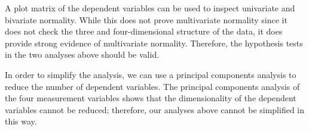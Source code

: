 \documentclass[11pt]{article} %
\begin{document}
\bigskip


A plot matrix of the dependent variables can be used to inspect univariate and bivariate normality. While this does not prove multivariate normality since it does not check the three and four-dimensional structure of the data, it does provide strong evidence of multivariate normality. Therefore, the hypothesis tests in the two analyses above should be valid.


\bigskip


In order to simplify the analysis, we can use a principal components analysis to reduce the number of dependent variables. The principal components analysis of the four measurement variables shows that the dimensionality of the dependent variables cannot be reduced; therefore, our analyses above cannot be simplified in this way.
\end{document}
